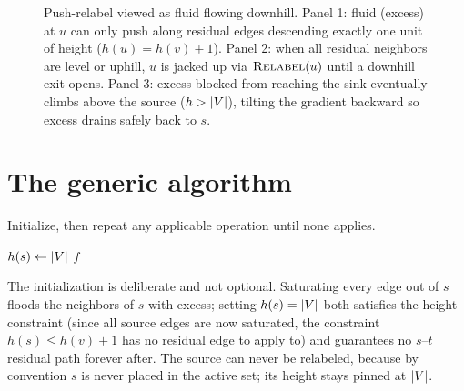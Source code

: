 \begin{figure}[H]
\caption{Push-relabel viewed as fluid flowing downhill. Panel 1: fluid (excess) at $u$ can only push along residual edges descending exactly one unit of height ($h(u)=h(v)+1$). Panel 2: when all residual neighbors are level or uphill, $u$ is jacked up via $\textsc{Relabel}(u)$ until a downhill exit opens. Panel 3: excess blocked from reaching the sink eventually climbs above the source ($h > \lvert V\rvert$), tilting the gradient backward so excess drains safely back to $s$.}
\label{ch13:fig-downhill-gradient}
\end{figure}

\section{The generic algorithm}
\label{ch13:generic}

Initialize, then repeat any applicable operation until none applies.

\begin{algorithm}[H]
\caption{$\textsc{GenericPushRelabel}(G,s,t)$}
\label{ch13:alg-generic}
\DontPrintSemicolon
{}
$h(s)\gets \lvert V\rvert$\;
\Return $f$\;
\end{algorithm}

The initialization is deliberate and not optional. Saturating every edge out of $s$ floods the neighbors of $s$ with excess; setting $h(s)=\lvert V\rvert$ both satisfies the height constraint (since all source edges are now saturated, the constraint $h(s)\le h(v)+1$ has no residual edge to apply to) and guarantees no $s$--$t$ residual path forever after. The source can never be relabeled, because by convention $s$ is never placed in the active set; its height stays pinned at $\lvert V\rvert$.


